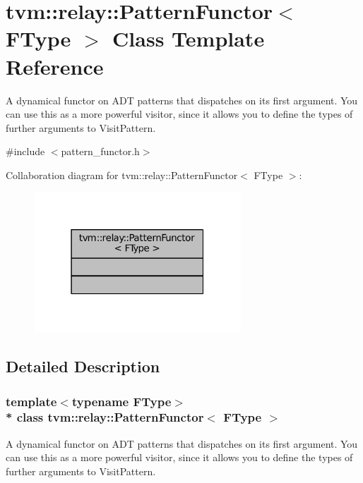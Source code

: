 \hypertarget{classtvm_1_1relay_1_1PatternFunctor}{}\section{tvm\+:\+:relay\+:\+:Pattern\+Functor$<$ F\+Type $>$ Class Template Reference}
\label{classtvm_1_1relay_1_1PatternFunctor}


A dynamical functor on A\+DT patterns that dispatches on its first argument. You can use this as a more powerful visitor, since it allows you to define the types of further arguments to Visit\+Pattern.  




{\ttfamily \#include $<$pattern\+\_\+functor.\+h$>$}



Collaboration diagram for tvm\+:\+:relay\+:\+:Pattern\+Functor$<$ F\+Type $>$\+:
\nopagebreak
\begin{figure}[H]
\begin{center}
\leavevmode
\includegraphics[width=220pt]{classtvm_1_1relay_1_1PatternFunctor__coll__graph}
\end{center}
\end{figure}


\subsection{Detailed Description}
\subsubsection*{template$<$typename F\+Type$>$\\*
class tvm\+::relay\+::\+Pattern\+Functor$<$ F\+Type $>$}

A dynamical functor on A\+DT patterns that dispatches on its first argument. You can use this as a more powerful visitor, since it allows you to define the types of further arguments to Visit\+Pattern. 

